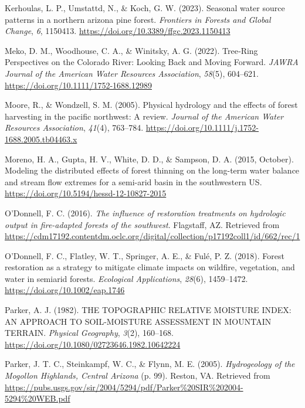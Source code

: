 \documentclass[
]{agujournal2019}
\newlength{\cslhangindent}
\newenvironment{CSLReferences}[2] %
 {\begin{list}{}{%
  \setlength{\itemindent}{0pt}
  \setlength{\leftmargin}{0pt}
  \setlength{\parsep}{0pt}
  \ifodd #1
   \setlength{\leftmargin}{\cslhangindent}
   \setlength{\itemindent}{-1\cslhangindent}
  \fi
  \setlength{\itemsep}{#2\baselineskip}}}
 {\end{list}}
\begin{document}
\begin{CSLReferences}{1}{0}
Kerhoulas, L. P., Umstattd, N., \& Koch, G. W. (2023). Seasonal water
source patterns in a northern arizona pine forest. \emph{Frontiers in
Forests and Global Change}, \emph{6}, 1150413.
\url{https://doi.org/10.3389/ffgc.2023.1150413}

Meko, D. M., Woodhouse, C. A., \& Winitsky, A. G. (2022). Tree‐{Ring}
{Perspectives} on the {Colorado} {River}: {Looking} {Back} and {Moving}
{Forward}. \emph{JAWRA Journal of the American Water Resources
Association}, \emph{58}(5), 604--621.
\url{https://doi.org/10.1111/1752-1688.12989}

Moore, R., \& Wondzell, S. M. (2005). Physical hydrology and the effects
of forest harvesting in the pacific northwest: {A} review. \emph{Journal
of the American Water Resources Association}, \emph{41}(4), 763--784.
\url{https://doi.org/10.1111/j.1752-1688.2005.tb04463.x}

Moreno, H. A., Gupta, H. V., White, D. D., \& Sampson, D. A. (2015,
October). Modeling the distributed effects of forest thinning on the
long-term water balance and stream flow extremes for a semi-arid basin
in the southwestern {US}.
\url{https://doi.org/10.5194/hessd-12-10827-2015}

O'Donnell, F. C. (2016). \emph{The influence of restoration treatments
on hydrologic output in fire-adapted forests of the southwest}.
Flagstaff, AZ. Retrieved from
\url{https://cdm17192.contentdm.oclc.org/digital/collection/p17192coll1/id/662/rec/1}

O'Donnell, F. C., Flatley, W. T., Springer, A. E., \& Fulé, P. Z.
(2018). Forest restoration as a strategy to mitigate climate impacts on
wildfire, vegetation, and water in semiarid forests. \emph{Ecological
Applications}, \emph{28}(6), 1459--1472.
\url{https://doi.org/10.1002/eap.1746}

Parker, A. J. (1982). THE TOPOGRAPHIC RELATIVE MOISTURE INDEX: AN
APPROACH TO SOIL-MOISTURE ASSESSMENT IN MOUNTAIN TERRAIN. \emph{Physical
Geography}, \emph{3}(2), 160--168.
\url{https://doi.org/10.1080/02723646.1982.10642224}

Parker, J. T. C., Steinkampf, W. C., \& Flynn, M. E. (2005).
\emph{Hydrogeology of the Mogollon Highlands, Central Arizona} (p. 99).
Reston, VA. Retrieved from
\url{https://pubs.usgs.gov/sir/2004/5294/pdf/Parker\%20SIR\%202004-5294\%20WEB.pdf}


\end{CSLReferences}
\end{document}
